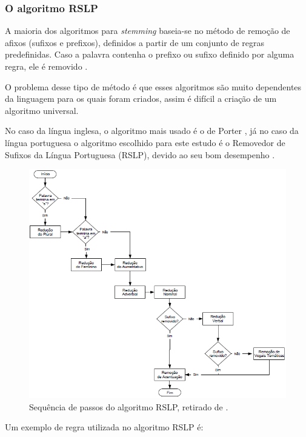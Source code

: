 \documentclass[a4paper,12pt]{article}
\begin{document}
\subsubsection {O algoritmo RSLP}
\label {sec:algoritmo_RSLP}

A maioria dos algoritmos para \textit{stemming} baseia-se no método de remoção de afixos (sufixos e prefixos), definidos a partir de um conjunto de regras predefinidas. Caso a palavra contenha o prefixo ou sufixo definido por alguma regra, ele é removido \cite{Alexandre07}.

O problema desse tipo de método é que esses algoritmos são muito dependentes da linguagem para os quais foram criados, assim é difícil a criação de um algoritmo universal.

No caso da língua inglesa, o algoritmo mais usado é o de Porter \cite{Manning09}, já no caso da língua portuguesa o algoritmo escolhido para este estudo é o Removedor de Sufixos da Língua Portuguesa (RSLP), devido ao seu bom desempenho \cite{Orengo01}.

\begin{figure}[H]
    \begin{center}
        \includegraphics[scale=0.5]{RSLP.png}
    \end{center}
    \caption{Sequência de passos do algoritmo RSLP, retirado de \cite{Orengo01}.}
    \label{fig:rslp}
\end{figure}

Um exemplo de regra utilizada no algoritmo RSLP é:
\end{document}
